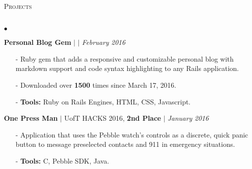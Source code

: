 \documentclass[11pt]{article}
\newcommand{\lineunder}{\vspace*{-8pt} \\ \hspace*{-18pt} \hrulefill \\}
\newcommand{\header}[1]{{\hspace*{-15pt}\vspace*{6pt} \textsc{#1}} \vspace*{-6pt} \lineunder }
\newenvironment{achievements}{\begin{list}{$\bullet$}{\topsep 0pt \itemsep -1.5pt \leftmargin 5pt}}{\vspace*{4pt}\end{list}}
\begin{document}
\header{\fontsize{11.4}{10}\selectfont Projects}
\begin{achievements}
\def\UrlFont{\em}
\item \textbf{Personal Blog Gem}  $|$  \href{https://github.com/nakulpathak3/personal-blog-gem}{\faGithub}  $|$ \href{https://rubygems.org/gems/personal_blog}{\faExternalLink} \hfill \textit {February 2016}
\begin{itemize}
\item[-]Ruby gem that adds a responsive and customizable personal blog with markdown support and code syntax highlighting to any Rails application.
\vspace{3pt}
\item[-]Downloaded over \textbf{1500} times since March 17, 2016.
\vspace{3pt}
\item[-]\textbf{Tools:} Ruby on Rails Engines, HTML, CSS, Javascript.
\end{itemize}

\vspace{6pt}

\item \textbf{One Press Man} {$|$ \scriptsize UofT HACKS 2016, \textbf{2nd Place}} $|$  \href{https://github.com/adrianmachado/Onepressman}{\faGithub} \hfill \textit {January 2016}
\begin{itemize}
\item[-]Application that uses the Pebble watch's controls as a discrete, quick panic button to message preselected contacts and 911 in emergency situations.
\vspace{3pt}
\item[-]\textbf{Tools:} C, Pebble SDK, Java.
\end{itemize}




\end{achievements}
\end{document}
